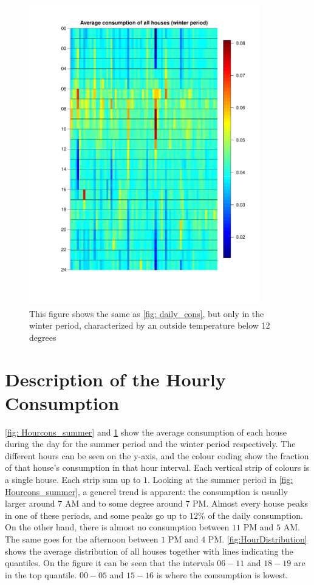 \begin{figure}
    \centering
    \includegraphics[width=0.9\textwidth]{../../../figures/Heatmap_winter.pdf}
    \caption{This figure shows the same as \cref{fig: daily_cons}, but only in the winter period, characterized by an outside temperature below 12 degrees}
    \label{fig: Hourcons_winter}
\end{figure}

%
\section{Description of the Hourly Consumption}
\noindent \cref{fig: Hourcons_summer} and \cref{fig: Hourcons_winter} show the average consumption of each house during the day for the summer period and the winter period respectively. The different hours can be seen on the y-axis, and the colour coding show the fraction of that house's consumption in that hour interval. Each vertical strip of colours is a single house. Each strip sum up to $1$. Looking at the summer period in \cref{fig: Hourcons_summer}, a generel trend is apparent: the consumption is usually larger around $7$ AM and to some degree around $7$ PM. Almost every house peaks in one of these periods, and some peaks go up to $12\%$ of the daily consumption. On the other hand, there is almost no consumption between $11$ PM and $5$ AM. The same goes for the afternoon between $1$ PM and $4$ PM. \cref{fig:HourDistribution} shows the average distribution of all houses together with lines indicating the quantiles. On the figure it can be seen that the intervals $06-11$ and $18-19$ are in the top quantile. $00-05$ and $15-16$ is where the consumption is lowest.

